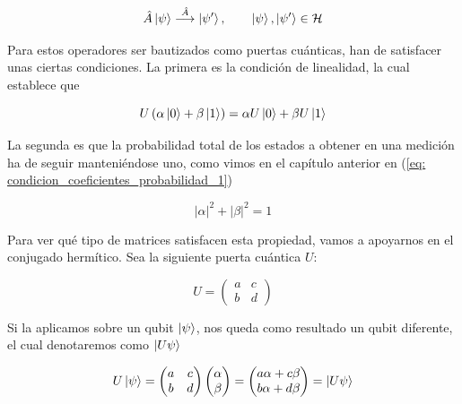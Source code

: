 \documentclass{article}
\numberwithin{equation}{section} %
\begin{document}
    \begin{equation*}
        \hat{A} \ket{\psi} \overset{\hat{A}}{\longrightarrow} \ket{\psi '}, \qquad \ket{\psi}, \ket{\psi '} \in \mathcal{H}
    \end{equation*}

    \vspace{2.5mm}

    Para estos operadores ser bautizados como puertas cuánticas, han de satisfacer unas ciertas condiciones. La primera es la condición de linealidad, la cual establece que

    \begin{equation*}
        U \left( \alpha \ket{0} + \beta \ket{1} \right) = \alpha U \ket{0} + \beta U \ket{1}
    \end{equation*}

    \vspace{2.5mm}

    La segunda es que la probabilidad total de los estados a obtener en una medición ha de seguir manteniéndose uno, como vimos en el capítulo anterior en (\ref{eq: condicion_coeficientes_probabilidad_1})

    \begin{equation*}
        | \alpha | ^ {2} + | \beta | ^ {2} = 1
    \end{equation*}

    \vspace{2.5mm}

    Para ver qué tipo de matrices satisfacen esta propiedad, vamos a apoyarnos en el conjugado hermítico. Sea la siguiente puerta cuántica \( U \):

    \begin{equation*}
        U = \begin{pmatrix}
            a & c \\
            b & d
        \end{pmatrix}
    \end{equation*}

    \vspace{2.5mm}

    Si la aplicamos sobre un qubit \( \ket{\psi} \), nos queda como resultado un qubit diferente, el cual denotaremos como \( \ket{U \psi} \)

    \begin{equation}
        U \ket{\psi} = \begin{pmatrix}
            a & c \\
            b & d
        \end{pmatrix} \begin{pmatrix}
            \alpha \\
            \beta
        \end{pmatrix} = \begin{pmatrix}
            a \alpha + c \beta \\
            b \alpha + d \beta
        \end{pmatrix} = \ket{U \psi}
    \label{eq: puerta_cuantica_vector_aplicado}
    \end{equation}
\end{document}
